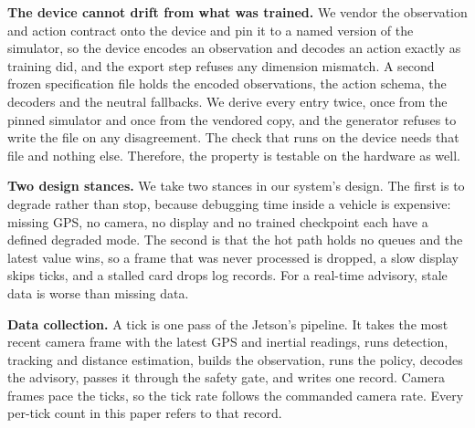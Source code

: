 \noindent\textbf{The device cannot drift from what was trained.} We vendor the observation and action contract onto the device and pin it to a named version of the simulator, so the device encodes an observation and decodes an action exactly as training did, and the export step refuses any dimension mismatch. A second frozen specification file holds the encoded observations, the action schema, the decoders and the neutral fallbacks. We derive every entry twice, once from the pinned simulator and once from the vendored copy, and the generator refuses to write the file on any disagreement. The check that runs on the device needs that file and nothing else. Therefore, the property is testable on the hardware as well.

\noindent\textbf{Two design stances.} We take two stances in our system's design. The first is to degrade rather than stop, because debugging time inside a vehicle is expensive: missing GPS, no camera, no display and no trained checkpoint each have a defined degraded mode. The second is that the hot path holds no queues and the latest value wins, so a frame that was never processed is dropped, a slow display skips ticks, and a stalled card drops log records. For a real-time advisory, stale data is worse than missing data.

\noindent\textbf{Data collection.} A tick is one pass of the Jetson's pipeline. It takes the most recent camera frame with the latest GPS and inertial readings, runs detection, tracking and distance estimation, builds the observation, runs the policy, decodes the advisory, passes it through the safety gate, and writes one record. Camera frames pace the ticks, so the tick rate follows the commanded camera rate. Every per-tick count in this paper refers to that record.